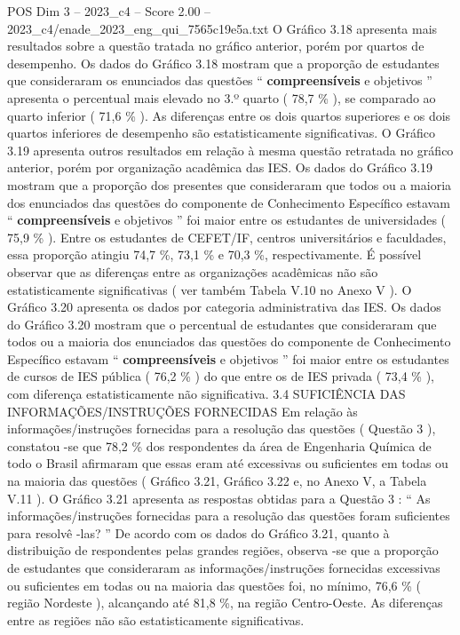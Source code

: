 \begin{textsample}{POS Dim 3 – 2023\_c4 – Score 2.00 – 2023\_c4/enade\_2023\_eng\_qui\_7565c19e5a.txt}
O Gráfico 3.18 apresenta mais resultados sobre a questão tratada no gráfico anterior, porém por quartos de desempenho.
Os dados do Gráfico 3.18 mostram que a proporção de estudantes que consideraram os enunciados das questões “ \textbf{compreensíveis} e objetivos ” apresenta o percentual mais elevado no 3.º quarto ( 78,7 \% ), se comparado ao quarto inferior ( 71,6 \% ).
As diferenças entre os dois quartos superiores e os dois quartos inferiores de desempenho são estatisticamente significativas.
O Gráfico 3.19 apresenta outros resultados em relação à mesma questão retratada no gráfico anterior, porém por organização acadêmica das IES.
Os dados do Gráfico 3.19 mostram que a proporção dos presentes que consideraram que todos ou a maioria dos enunciados das questões do componente de Conhecimento Específico estavam “ \textbf{compreensíveis} e objetivos ” foi maior entre os estudantes de universidades ( 75,9 \% ).
Entre os estudantes de CEFET/IF, centros universitários e faculdades, essa proporção atingiu 74,7 \%, 73,1 \% e 70,3 \%, respectivamente.
É possível observar que as diferenças entre as organizações acadêmicas não são estatisticamente significativas ( ver também Tabela V.10 no Anexo V ).
O Gráfico 3.20 apresenta os dados por categoria administrativa das IES.
Os dados do Gráfico 3.20 mostram que o percentual de estudantes que consideraram que todos ou a maioria dos enunciados das questões do componente de Conhecimento Específico estavam “ \textbf{compreensíveis} e objetivos ” foi maior entre os estudantes de cursos de IES pública ( 76,2 \% ) do que entre os de IES privada ( 73,4 \% ), com diferença estatisticamente não significativa. 3.4 SUFICIÊNCIA DAS INFORMAÇÕES/INSTRUÇÕES FORNECIDAS Em relação às informações/instruções fornecidas para a resolução das questões ( Questão 3 ), constatou -se que 78,2 \% dos respondentes da área de Engenharia Química de todo o Brasil afirmaram que essas eram até excessivas ou suficientes em todas ou na maioria das questões ( Gráfico 3.21, Gráfico 3.22 e, no Anexo V, a Tabela V.11 ).
O Gráfico 3.21 apresenta as respostas obtidas para a Questão 3 : “ As informações/instruções fornecidas para a resolução das questões foram suficientes para resolvê -las? ” De acordo com os dados do Gráfico 3.21, quanto à distribuição de respondentes pelas grandes regiões, observa -se que a proporção de estudantes que consideraram as informações/instruções fornecidas excessivas ou suficientes em todas ou na maioria das questões foi, no mínimo, 76,6 \% ( região Nordeste ), alcançando até 81,8 \%, na região Centro-Oeste.
As diferenças entre as regiões não são estatisticamente significativas.

\end{textsample}
